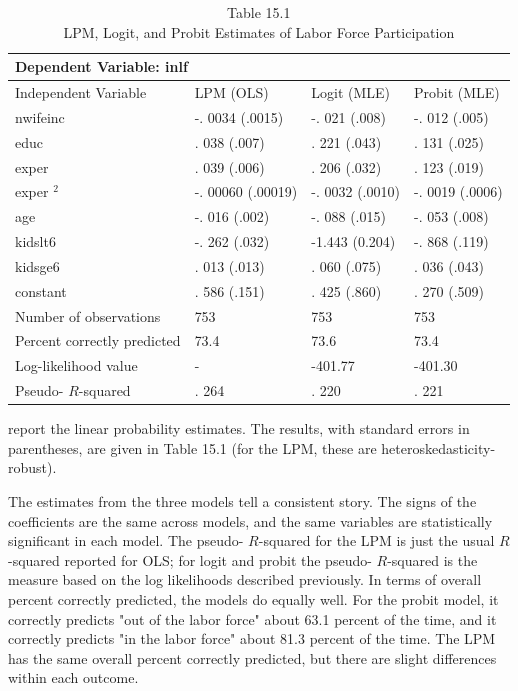 \documentclass[10pt]{article}
\begin{document}
\begin{table}[h]
\begin{center}
\captionsetup{labelformat=empty}
\caption{Table 15.1\\
LPM, Logit, and Probit Estimates of Labor Force Participation}
\begin{tabular}{|l|l|l|l|}
\hline
\multicolumn{4}{|l|}{Dependent Variable: inlf} \\
\hline
Independent Variable & LPM (OLS) & Logit (MLE) & Probit (MLE) \\
\hline
nwifeinc & -. 0034 (.0015) & -. 021 (.008) & -. 012 (.005) \\
\hline
educ & . 038 (.007) & . 221 (.043) & . 131 (.025) \\
\hline
exper & . 039 (.006) & . 206 (.032) & . 123 (.019) \\
\hline
exper ${ }^{2}$ & -. 00060 (.00019) & -. 0032 (.0010) & -. 0019 (.0006) \\
\hline
age & -. 016 (.002) & -. 088 (.015) & -. 053 (.008) \\
\hline
kidslt6 & -. 262 (.032) & -1.443 (0.204) & -. 868 (.119) \\
\hline
kidsge6 & . 013 (.013) & . 060 (.075) & . 036 (.043) \\
\hline
constant & . 586 (.151) & . 425 (.860) & . 270 (.509) \\
\hline
Number of observations & 753 & 753 & 753 \\
\hline
Percent correctly predicted & 73.4 & 73.6 & 73.4 \\
\hline
Log-likelihood value & - & -401.77 & -401.30 \\
\hline
Pseudo- $R$-squared & . 264 & . 220 & . 221 \\
\hline
\end{tabular}
\end{center}
\end{table}

report the linear probability estimates. The results, with standard errors in parentheses, are given in Table 15.1 (for the LPM, these are heteroskedasticity-robust).

The estimates from the three models tell a consistent story. The signs of the coefficients are the same across models, and the same variables are statistically significant in each model. The pseudo- $R$-squared for the LPM is just the usual $R$-squared reported for OLS; for logit and probit the pseudo- $R$-squared is the measure based on the log likelihoods described previously. In terms of overall percent correctly predicted, the models do equally well. For the probit model, it correctly predicts "out of the labor force" about 63.1 percent of the time, and it correctly predicts "in the labor force" about 81.3 percent of the time. The LPM has the same overall percent correctly predicted, but there are slight differences within each outcome.
\end{document}
